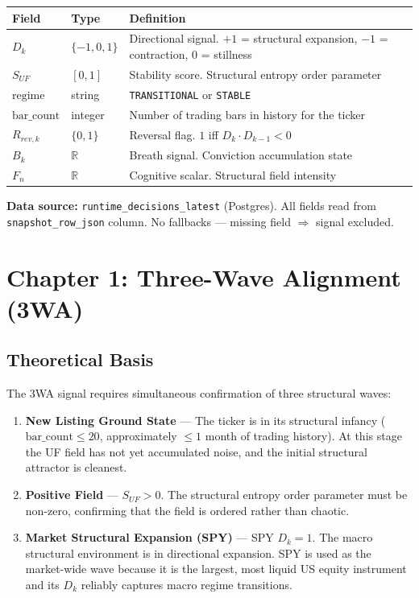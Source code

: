 \documentclass[11pt, a4paper]{article}
\begin{document}
\begin{center}
\begin{tabular}{@{}lll@{}}
\toprule
\textbf{Field} & \textbf{Type} & \textbf{Definition} \\
\midrule
$D_k$          & $\{-1, 0, 1\}$ & Directional signal. $+1$ = structural expansion, $-1$ = contraction, $0$ = stillness \\
$S_{UF}$       & $[0, 1]$       & Stability score. Structural entropy order parameter \\
$\text{regime}$ & string        & \texttt{TRANSITIONAL} or \texttt{STABLE} \\
$\text{bar\_count}$ & integer   & Number of trading bars in history for the ticker \\
$R_{rev,k}$    & $\{0, 1\}$    & Reversal flag. $1$ iff $D_k \cdot D_{k-1} < 0$ \\
$B_k$          & $\mathbb{R}$  & Breath signal. Conviction accumulation state \\
$F_n$          & $\mathbb{R}$  & Cognitive scalar. Structural field intensity \\
\bottomrule
\end{tabular}
\end{center}

\textbf{Data source:} \texttt{runtime\_decisions\_latest} (Postgres). All fields read
from \texttt{snapshot\_row\_json} column. No fallbacks — missing field $\Rightarrow$
signal excluded.

\section{Chapter 1: Three-Wave Alignment (3WA)}

\subsection{Theoretical Basis}

The 3WA signal requires simultaneous confirmation of three structural waves:

\begin{enumerate}[label=\textbf{Wave \arabic*.}]
  \item \textbf{New Listing Ground State} — The ticker is in its structural infancy
        ($\text{bar\_count} \leq 20$, approximately $\leq 1$ month of trading history).
        At this stage the UF field has not yet accumulated noise, and the initial
        structural attractor is cleanest.

  \item \textbf{Positive Field} — $S_{UF} > 0$. The structural entropy order parameter
        must be non-zero, confirming that the field is ordered rather than chaotic.

  \item \textbf{Market Structural Expansion (SPY)} — SPY $D_k = 1$. The macro structural
        environment is in directional expansion. SPY is used as the market-wide wave
        because it is the largest, most liquid US equity instrument and its $D_k$
        reliably captures macro regime transitions.
\end{enumerate}
\end{document}
